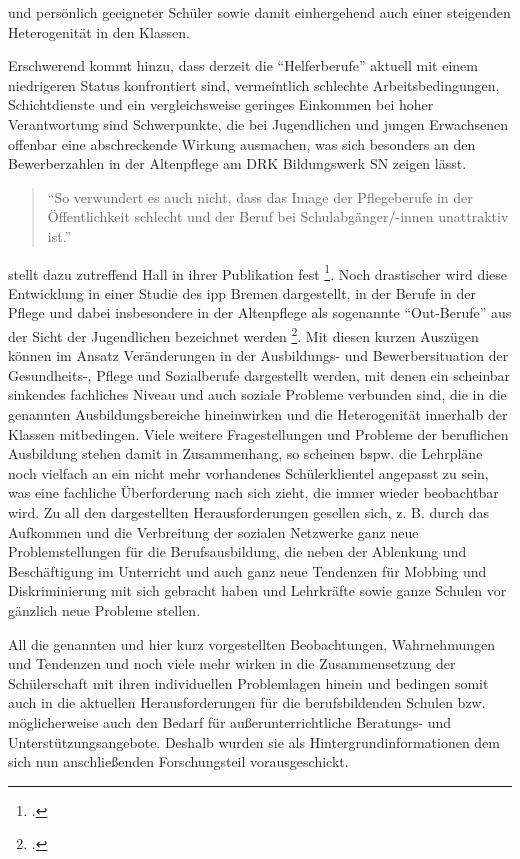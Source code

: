 und persönlich geeigneter Schüler sowie damit einhergehend auch einer steigenden Heterogenität in den Klassen. 

Erschwerend kommt hinzu, dass derzeit die "`Helferberufe"' aktuell mit einem niedrigeren Status konfrontiert sind, vermeintlich schlechte Arbeitsbedingungen, Schichtdienste und ein vergleichsweise geringes Einkommen bei hoher Verantwortung sind Schwerpunkte, die bei Jugendlichen und jungen Erwachsenen offenbar eine abschreckende Wirkung ausmachen, was sich besonders an den Bewerberzahlen in der Altenpflege am DRK Bildungswerk SN zeigen lässt. 

\begin{quotation}
\noindent
"`So verwundert es auch nicht, dass das Image der Pflegeberufe in der Öffentlichkeit schlecht und der Beruf bei Schulabgänger/-innen unattraktiv ist."'
\end{quotation}

\noindent 
[\punkte] stellt dazu zutreffend Hall in ihrer Publikation fest \footcite[19]{Hall2012}. Noch drastischer wird diese Entwicklung in einer Studie des ipp Bremen dargestellt, in der Berufe in der Pflege und dabei insbesondere in der Altenpflege als sogenannte "`Out-Berufe"' aus der Sicht der Jugendlichen bezeichnet werden \footcite[18]{BPHP2010}. Mit diesen kurzen Auszügen können im Ansatz Veränderungen in der Ausbildungs- und Bewerbersituation der Gesundheits-, Pflege und Sozialberufe dargestellt werden, mit denen ein scheinbar sinkendes fachliches Niveau und auch soziale Probleme verbunden sind, die in die genannten Ausbildungsbereiche hineinwirken und die Heterogenität innerhalb der Klassen mitbedingen. Viele weitere Fragestellungen und Probleme der beruflichen Ausbildung stehen damit in Zusammenhang, so scheinen bspw. die Lehrpläne noch vielfach an ein nicht mehr vorhandenes Schülerklientel angepasst zu sein, was eine fachliche Überforderung nach sich zieht, die immer wieder beobachtbar wird. Zu all den dargestellten Herausforderungen gesellen sich, z. B. durch das Aufkommen und die Verbreitung der sozialen Netzwerke ganz neue Problemstellungen für die Berufsausbildung, die neben der Ablenkung und Beschäftigung im Unterricht und auch ganz neue Tendenzen für Mobbing und Diskriminierung mit sich gebracht haben und Lehrkräfte sowie ganze Schulen vor gänzlich neue Probleme stellen.

All die genannten und hier kurz vorgestellten Beobachtungen, Wahrnehmungen und Tendenzen und noch viele mehr wirken in die Zusammensetzung der Schülerschaft mit ihren individuellen Problemlagen hinein und bedingen somit auch in die aktuellen Herausforderungen für die berufsbildenden Schulen bzw. möglicherweise auch den Bedarf für außerunterrichtliche Beratungs- und Unterstützungsangebote. Deshalb wurden sie als Hintergrundinformationen dem sich nun anschließenden Forschungsteil vorausgeschickt. 
